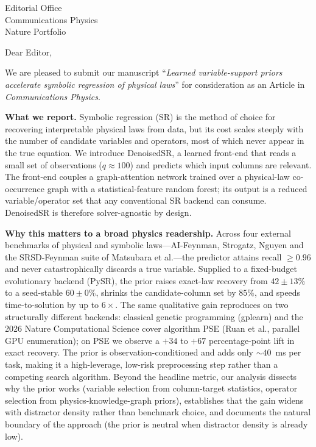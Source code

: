 \documentclass[11pt]{letter}
\date{June 10, 2026}
\begin{document}
\begin{letter}{Editorial Office\\Communications Physics\\Nature Portfolio}
\opening{Dear Editor,}

We are pleased to submit our manuscript ``\emph{Learned variable-support priors
accelerate symbolic regression of physical laws}'' for consideration as an
Article in \emph{Communications Physics}.

\textbf{What we report.} Symbolic regression (SR) is the method of choice for
recovering interpretable physical laws from data, but its cost scales steeply
with the number of candidate variables and operators, most of which never
appear in the true equation. We introduce DenoisedSR, a learned front-end that
reads a small set of observations ($q \approx 100$) and predicts which input
columns are relevant. The front-end couples a graph-attention network trained
over a physical-law co-occurrence graph with a statistical-feature random
forest; its output is a reduced variable/operator set that any conventional SR
backend can consume. DenoisedSR is therefore solver-agnostic by design.

\textbf{Why this matters to a broad physics readership.}
Across four external benchmarks of physical and symbolic laws---AI-Feynman,
Strogatz, Nguyen and the SRSD-Feynman suite of Matsubara et al.---the predictor
attains recall $\ge 0.96$ and never catastrophically discards a true variable.
Supplied to a fixed-budget evolutionary backend (PySR), the prior raises
exact-law recovery from $42\pm13\%$ to a seed-stable $60\pm0\%$, shrinks the
candidate-column set by $85\%$, and speeds time-to-solution by up to
$6\times$. The same qualitative gain reproduces on two structurally different
backends: classical genetic programming (gplearn) and the 2026 Nature
Computational Science cover algorithm PSE (Ruan et al., parallel GPU
enumeration); on PSE we observe a $+34$ to $+67$ percentage-point lift in
exact recovery. The prior is observation-conditioned and adds only
${\sim}40$~ms per task, making it a high-leverage, low-risk preprocessing
step rather than a competing search algorithm. Beyond the headline metric,
our analysis dissects why the prior works (variable selection from
column-target statistics, operator selection from physics-knowledge-graph
priors), establishes that the gain widens with distractor density rather than
benchmark choice, and documents the natural boundary of the approach (the
prior is neutral when distractor density is already low).


\end{letter}
\end{document}

